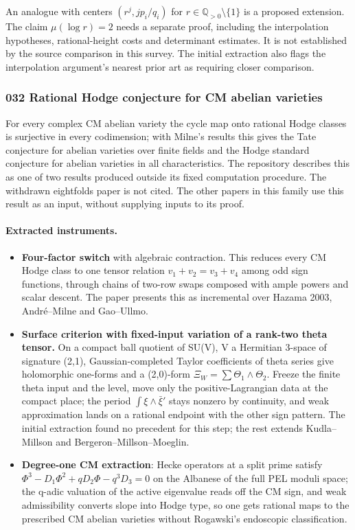 \documentclass[11pt]{article}
\newcommand{\badges}[1]{\par\noindent{\small\sffamily\color{black!70}#1}\par\smallskip}
\newcommand{\badgesep}{\textbar}
\begin{document}
An analogue with centers $(r^j,jp_i/q_i)$ for $r\in\mathbb Q_{>0}\setminus\{1\}$ is a proposed extension. The claim $\mu(\log r)=2$ needs a separate proof, including the interpolation hypotheses, rational-height costs and determinant estimates. It is not established by the source comparison in this survey. The initial extraction also flags the interpolation argument's nearest prior art as requiring closer comparison.

\subsubsection{\texorpdfstring{032 \textperiodcentered{} Rational Hodge conjecture for CM abelian varieties}{032 · Rational Hodge conjecture for CM abelian varieties}}\label{fam:032}
\badges{not formalized \badgesep{} combination}

For every complex CM abelian variety the cycle map onto rational Hodge classes is surjective in every codimension; with Milne's results this gives the Tate conjecture for abelian varieties over finite fields and the Hodge standard conjecture for abelian varieties in all characteristics. The repository describes this as one of two results produced outside its fixed computation procedure. The withdrawn eightfolds paper is not cited. The other papers in this family use this result as an input, without supplying inputs to its proof.

\paragraph{Extracted instruments.}

\begin{itemize}
\item \textbf{Four-factor switch} with algebraic contraction. This reduces every CM Hodge class to one tensor relation $v_1+v_2=v_3+v_4$ among odd sign functions, through chains of two-row swaps composed with ample powers and scalar descent. The paper presents this as incremental over Hazama 2003, André--Milne and Gao--Ullmo.
\item \textbf{Surface criterion with fixed-input variation of a rank-two theta tensor.} On a compact ball quotient of SU(V), V a Hermitian 3-space of signature (2,1), Gaussian-completed Taylor coefficients of theta series give holomorphic one-forms and a (2,0)-form $\Xi_W=\sum\Theta_1\wedge\Theta_2$. Freeze the finite theta input and the level, move only the positive-Lagrangian data at the compact place; the period $\int\xi\wedge\bar\xi'$ stays nonzero by continuity, and weak approximation lands on a rational endpoint with the other sign pattern. The initial extraction found no precedent for this step; the rest extends Kudla--Millson and Bergeron--Millson--Moeglin.
\item \textbf{Degree-one CM extraction}: Hecke operators at a split prime satisfy $\Phi^3-D_1\Phi^2+qD_2\Phi-q^3D_3=0$ on the Albanese of the full PEL moduli space; the q-adic valuation of the active eigenvalue reads off the CM sign, and weak admissibility converts slope into Hodge type, so one gets rational maps to the prescribed CM abelian varieties without Rogawski's endoscopic classification.
\end{itemize}
\end{document}
